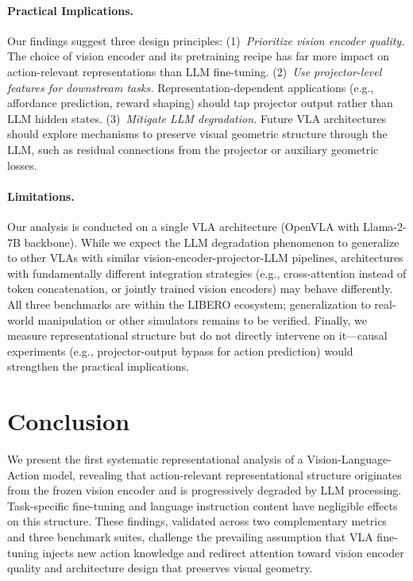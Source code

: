 \documentclass[10pt,letterpaper]{article}
\begin{document}
\paragraph{Practical Implications.}
Our findings suggest three design principles:
(1)~\textit{Prioritize vision encoder quality.} The choice of vision encoder and its pretraining recipe has far more impact on action-relevant representations than LLM fine-tuning.
(2)~\textit{Use projector-level features for downstream tasks.} Representation-dependent applications (e.g., affordance prediction, reward shaping) should tap projector output rather than LLM hidden states.
(3)~\textit{Mitigate LLM degradation.} Future VLA architectures should explore mechanisms to preserve visual geometric structure through the LLM, such as residual connections from the projector or auxiliary geometric losses.

\paragraph{Limitations.}
Our analysis is conducted on a single VLA architecture (OpenVLA with Llama-2-7B backbone).
While we expect the LLM degradation phenomenon to generalize to other VLAs with similar vision-encoder-projector-LLM pipelines, architectures with fundamentally different integration strategies (e.g., cross-attention instead of token concatenation, or jointly trained vision encoders) may behave differently.
All three benchmarks are within the LIBERO ecosystem; generalization to real-world manipulation or other simulators remains to be verified.
Finally, we measure representational structure but do not directly intervene on it---causal experiments (e.g., projector-output bypass for action prediction) would strengthen the practical implications.


\section{Conclusion}
\label{sec:conclusion}

We present the first systematic representational analysis of a Vision-Language-Action model, revealing that action-relevant representational structure originates from the frozen vision encoder and is progressively degraded by LLM processing.
Task-specific fine-tuning and language instruction content have negligible effects on this structure.
These findings, validated across two complementary metrics and three benchmark suites, challenge the prevailing assumption that VLA fine-tuning injects new action knowledge and redirect attention toward vision encoder quality and architecture design that preserves visual geometry.
\end{document}
